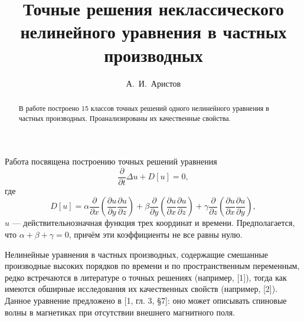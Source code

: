 

\fi

\title{Точные решения неклассического нелинейного уравнения в частных производных}
\author{А.~И.~Аристов
  } %




\maketitle

\begin{abstract}
В работе построено 15 классов точных решений одного нелинейного уравнения в частных производных. Проанализированы их качественные свойства.

\end{abstract}


Работа посвящена построению точных решений уравнения
$$
\frac{\partial}{\partial t}\Delta u+D[u]=0,\label{1}
$$
где
$$
D[u]=\alpha\frac{\partial}{\partial x}\left(\frac{\partial u}{\partial y}\frac{\partial u}{\partial z}\right)+
\beta\frac{\partial}{\partial y}\left(\frac{\partial u}{\partial x}\frac{\partial u}{\partial z}\right)+
\gamma\frac{\partial}{\partial z}\left(\frac{\partial u}{\partial x}\frac{\partial u}{\partial y}\right),
$$
$u$ --- действительнозначная функция трех координат и времени.
Предполагается, что $\alpha+\beta+\gamma=0$, причём эти коэффициенты не все равны нулю.

Нелинейные уравнения в частных производных, содержащие смешанные производные высоких порядков по времени и по пространственным
переменным, редко встречаются в литературе о точных решениях (например, [1]), тогда как имеются обширные исследования их качественных
свойств (например, [2]). Данное уравнение предложено в [1, гл. 3, \S 7]: оно может описывать спиновые волны в магнетиках при отсутствии
внешнего магнитного поля.

